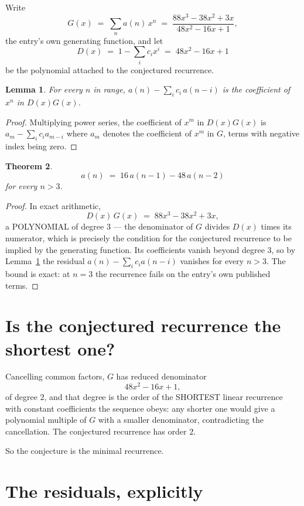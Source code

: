 \documentclass[11pt,a4paper]{article}
\theoremstyle{plain}
\newtheorem{theorem}{Theorem}
\newtheorem{lemma}[theorem]{Lemma}
\theoremstyle{definition}
\begin{document}
Write
\[
G(x)\;=\;\sum_{n}a(n)\,x^{n}\;=\;\frac{88 x^{3} - 38 x^{2} + 3 x}{48 x^{2} - 16 x + 1},
\]
the entry's own generating function, and let
\[
D(x)\;=\;1-\sum_i c_i x^{i}\;=\;48 x^{2} - 16 x + 1
\]
be the polynomial attached to the conjectured recurrence.

\begin{lemma}\label{lem:key}
For every $n$ in range, $a(n)-\sum_i c_i\,a(n-i)$ is the coefficient of $x^{n}$ in
$D(x)G(x)$.
\end{lemma}

\begin{proof}
Multiplying power series, the coefficient of $x^{m}$ in $D(x)G(x)$ is
$a_m-\sum_i c_i a_{m-i}$ where $a_m$ denotes the coefficient of $x^{m}$ in $G$, terms with
negative index being zero.
\end{proof}

\begin{theorem}
\[
a(n)\;=\;16\,a(n-1) - 48\,a(n-2)
\]
for every $n>3$.
\end{theorem}

\begin{proof}
In exact arithmetic,
\[
D(x)\,G(x)\;=\;88 x^{3} - 38 x^{2} + 3 x,
\]
a POLYNOMIAL of degree $3$ --- the denominator of $G$ divides $D(x)$ times its numerator,
which is precisely the condition for the conjectured recurrence to be implied by the
generating function. Its coefficients vanish beyond degree $3$, so by
Lemma~\ref{lem:key} the residual $a(n)-\sum_ic_ia(n-i)$ vanishes for every
$n>3$. The bound is exact: at $n=3$ the recurrence fails on the entry's own published terms.
\end{proof}

\section{Is the conjectured recurrence the shortest one?}

Cancelling common factors, $G$ has reduced denominator
\[
48 x^{2} - 16 x + 1,
\]
of degree $2$, and that degree is the order of the SHORTEST linear recurrence with
constant coefficients the sequence obeys: any shorter one would give a polynomial multiple of
$G$ with a smaller denominator, contradicting the cancellation. The conjectured recurrence has
order $2$.

So the conjecture is the minimal recurrence.

\section{The residuals, explicitly}
\end{document}
